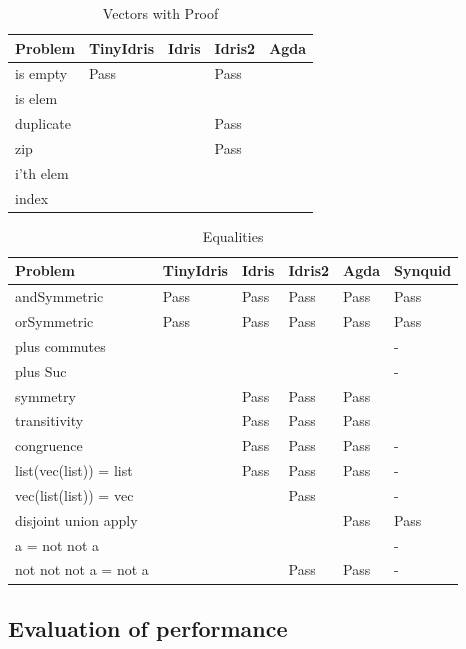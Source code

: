 \documentclass[a4paper]{article}
\begin{document}
\begin{table}[!htb]
  \begin{center}
\begin{tabular}{|l|l|l|l|l|}
\hline
Problem & TinyIdris & Idris & Idris2 & Agda\\
\hline
is empty & Pass &   & Pass &  \\
is elem &   &   &   &  \\
duplicate &   &   & Pass &  \\
zip &   &   & Pass &  \\
i'th elem &   &   &   &  \\
index &   &   &   &  \\
\hline
\end{tabular}
\caption{Vectors with Proof}
\end{center}
\end{table}

\begin{table}[!htb]
  \begin{center}
\begin{tabular}{|l|l|l|l|l|l|}
\hline
Problem & TinyIdris & Idris & Idris2 & Agda & Synquid\\
\hline
andSymmetric & Pass & Pass & Pass & Pass & Pass \\
orSymmetric &  Pass & Pass & Pass & Pass & Pass \\
plus commutes &   &   &   & & - \\
plus Suc &   &   &   &  & - \\
symmetry &   & Pass & Pass & Pass & \\
transitivity &   & Pass & Pass & Pass & \\
congruence &   & Pass & Pass & Pass & - \\
list(vec(list)) = list &   & Pass & Pass & Pass & - \\
vec(list(list)) = vec &   &   & Pass &  & - \\
disjoint union apply &   &   &   & Pass & Pass \\
a = not not a &   &   &   &  & -\\
not not not a = not a &   &   & Pass & Pass & - \\
\hline
\end{tabular}
\caption{Equalities}
\end{center}
\end{table}

\subsection{Evaluation of performance}
\label{sec:org4c9aa94}
\end{document}
